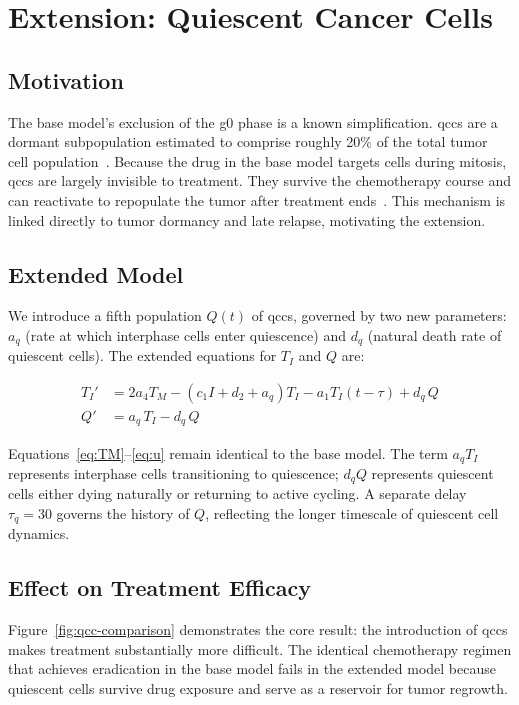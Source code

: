 \section{Extension: Quiescent Cancer Cells}
\label{sec:extension}

\subsection{Motivation}

The base model's exclusion of the \gls{g0} phase is a known simplification. \gls{qcc}s are a dormant subpopulation estimated to comprise roughly 20\% of the total tumor cell population~\cite{villasana_delay_2003}. Because the drug in the base model targets cells during mitosis, \gls{qcc}s are largely invisible to treatment. They survive the chemotherapy course and can reactivate to repopulate the tumor after treatment ends~\cite{davis_tumor_2019}. This mechanism is linked directly to tumor dormancy and late relapse, motivating the extension.

\subsection{Extended Model}

We introduce a fifth population $Q(t)$ of \gls{qcc}s, governed by two new parameters: $a_q$ (rate at which interphase cells enter quiescence) and $d_q$ (natural death rate of quiescent cells). The extended equations for $T_I$ and $Q$ are:

\begin{align}
  T_I' &= 2a_4T_M - (c_1I + d_2 + a_q)T_I - a_1T_I(t-\tau) + d_q\, Q \\
  Q'   &= a_q\, T_I - d_q\, Q
\end{align}

Equations~\ref{eq:TM}--\ref{eq:u} remain identical to the base model. The term $a_q T_I$ represents interphase cells transitioning to quiescence; $d_q Q$ represents quiescent cells either dying naturally or returning to active cycling. A separate delay $\tau_q = 30$ governs the history of $Q$, reflecting the longer timescale of quiescent cell dynamics.

\subsection{Effect on Treatment Efficacy}

Figure~\ref{fig:qcc-comparison} demonstrates the core result: the introduction of \gls{qcc}s makes treatment substantially more difficult. The identical chemotherapy regimen that achieves eradication in the base model fails in the extended model because quiescent cells survive drug exposure and serve as a reservoir for tumor regrowth.

